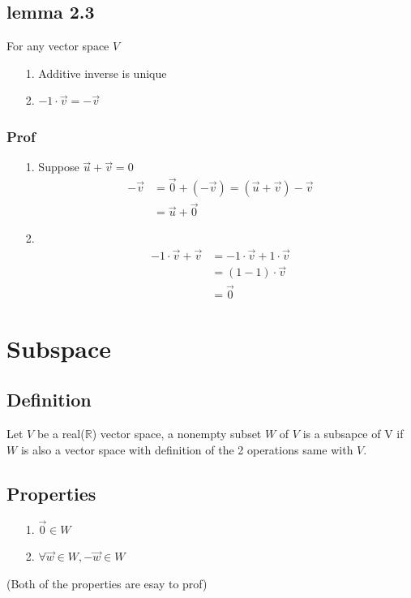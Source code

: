 \documentclass{article}
\begin{document}
\subsection*{lemma 2.3}
For any vector space \(V\)
\begin{itemize}
    \item [1.] Additive inverse is unique
    \item [2.] \(-1\cdot\overrightarrow{v}=-\overrightarrow{v}\)
\end{itemize}
\subsubsection*{Prof}
\begin{itemize}
    \item [1.] Suppose \(\overrightarrow{u}+\overrightarrow{v}=0\)
    \begin{align*}
        -\overrightarrow{v}&=\overrightarrow{0}+(-\overrightarrow{v})=(\overrightarrow{u}+\overrightarrow{v})-\overrightarrow{v}\\
        &=\overrightarrow{u}+\overrightarrow{0}
    \end{align*}
    \item [2.] 
    \begin{align*}
        -1\cdot \overrightarrow{v} +\overrightarrow{v}&=-1\cdot\overrightarrow{v}+1\cdot\overrightarrow{v}\\
        &=(1-1)\cdot \overrightarrow{v}\\
        &=\overrightarrow{0}
    \end{align*}
\end{itemize}
\section*{Subspace}
\subsection*{Definition}
Let \(V\) be a real(\(\mathbb{R}\)) vector space, a nonempty subset \(W\) of \(V\) is a subsapce of V if \(W\) is also a vector space with definition of the 2 operations same with \(V\).
\subsection*{Properties}
\begin{itemize}
    \item [1.] \(\overrightarrow{0}\in W\)
    \item [2.] \(\forall \overrightarrow{w} \in W, -\overrightarrow{w}\in W\)
\end{itemize}
(Both of the properties are esay to prof)
\end{document}
